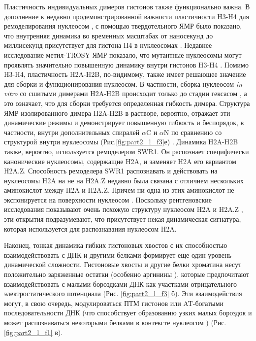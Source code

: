   Пластичность индивидуальных димеров гистонов также функционально важна. В дополнение к недавно продемонстрированной важности пластичности H3-H4 для ремоделирования нуклеосом \cite{sinha_distortion_2017}, с помощью твердотельного ЯМР было показано, что внутренняя динамика во временных масштабах от наносекунд до миллисекунд присутствует для гистона H4 в нуклеосомах \cite{shi_structure_2018}. Недавнее исследование метил-TROSY ЯМР показало, что мутантные нуклеосомы могут проявлять значительно повышенную динамику внутри гистонов H3-H4 \cite{kitevski-leblanc_investigating_2018}. Помимо H3-H4, пластичность H2A-H2B, по-видимому, также имеет решающее значение для сборки и функционирования нуклеосом. В частности, сборка нуклеосом \textit{in vitro} со сшитыми димерами H2A-H2B происходит только до стадии гексасом \cite{bilokapic_histone_2018}, а это означает, что для сборки требуется определенная гибкость димера. Структура ЯМР  изолированного димера H2A-H2B в растворе, вероятно, отражает эти динамические режимы и демонстрирует повышенную гибкость и беспорядок, в частности, внутри дополнительных спиралей $\alpha$C и $\alpha$N по сравнению со структурой внутри нуклеосомы (Рис.\ref{fig:part2_1_f3}е) \cite{moriwaki_solution_2016}. Динамика H2A-H2B также, вероятно, используется ремоделером SWR1. Он распознает специфически канонические нуклеосомы, содержащие H2A, и заменяет H2A его вариантом H2A.Z. Способность ремоделера SWR1 распознавать и действовать на нуклеосомы H2A на не на H2A.Z недавно была связана с отличием нескольких аминокислот между H2A и H2A.Z. Причем ни одна из этих аминокислот не экспонируется на поверхности нуклеосом \cite{ranjan_h2a_2015}. Поскольку рентгеновские исследования показывают очень похожую структуру нуклеосом H2A и H2A.Z \cite{suto_crystal_2000}, эти открытия подразумевают, что присутствует некая динамическая сигнатура, которая используется для распознавания нуклеосом H2A.
    
    Наконец, тонкая динамика гибких гистоновых хвостов с их способностью взаимодействовать с ДНК и другими белками формирует еще один уровень динамической сложности. Гистоновые хвосты и другие белки хроматина несут положительно заряженные остатки (особенно аргинины \cite{west_electrostatic_2010,dragan_energetics_2003}), которые предпочитают взаимодействовать с малыми бороздками ДНК как участками отрицательного электростатического потенциала (Рис. \ref{fig:part2_1_f3} б). Эти взаимодействия могут, в свою очередь, модулироваться ПТМ гистонов или AT-богатыми последовательности ДНК (что способствует образованию узких малых бороздок \cite{freeman_dna_2014} и может распознаваться некоторыми белками в контексте нуклеосом \cite{xiao_molecular_2017}) (Рис. \ref{fig:part2_1_f1} в). 



